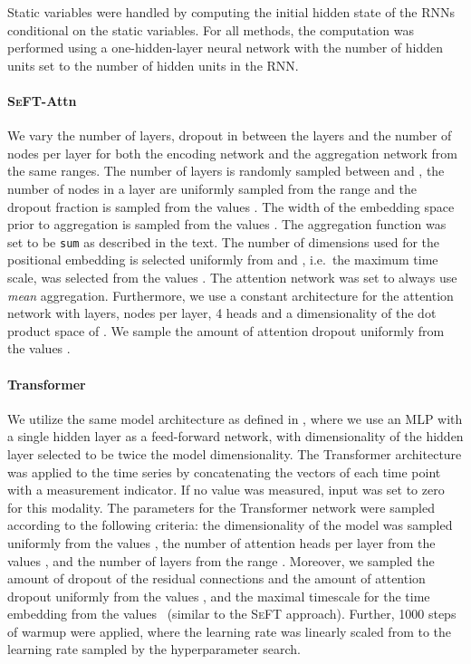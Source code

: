 \documentclass{article}
\newcommand{\methodname}     {\textsc{SeFT}\xspace}
\begin{document}
Static variables were handled by computing the initial hidden state of
the RNNs conditional on the static variables. For all methods, the
computation was performed using a one-hidden-layer neural network with
the number of hidden units set to the number of hidden units in the RNN. 

\paragraph{\methodname-Attn}
We vary the number of layers, dropout in between the layers and the number of
nodes per layer for both the encoding network  and the aggregation
network  from the same ranges. The number of layers is randomly sampled
between  and , the number of nodes in a layer are uniformly sampled from
the range  and the dropout fraction is sampled
from the values . The width of the embedding space prior
to aggregation is sampled from the values . The aggregation function was set to be \texttt{sum} as described in the text.
The number of dimensions used for the positional embedding  is selected
uniformly from  and , i.e.\ the maximum
time scale, was selected from the values .
The attention network  was set to always use \emph{mean} aggregation. 
Furthermore, we use a constant architecture for the attention network
 with  layers,  nodes per layer, 4 heads and a dimensionality
of the dot product space  of . We sample the amount of attention
dropout uniformly from the values .

\paragraph{Transformer}
We utilize the same model architecture as defined in
\citet{vaswani2017attention}, where we use an MLP with a single hidden
layer as a feed-forward network, with dimensionality of the hidden layer selected to be
twice the model dimensionality. The Transformer architecture was applied to the
time series by concatenating the vectors of each time point with a measurement
indicator. If no value was measured, input was set to zero for this modality.
The parameters for the Transformer network were sampled according to the
following criteria: the dimensionality of the model was sampled uniformly from
the values , the number of attention heads per layer
from the values , and the number of layers from the range . Moreover, we sampled the amount of dropout of the residual
connections and the amount of attention dropout uniformly from the values
, and the maximal timescale for the time embedding
from the values ~(similar to the \methodname approach).
Further, 1000 steps of warmup were applied, where the learning rate was
linearly scaled from  to the learning rate  sampled by
the hyperparameter search.
\end{document}

